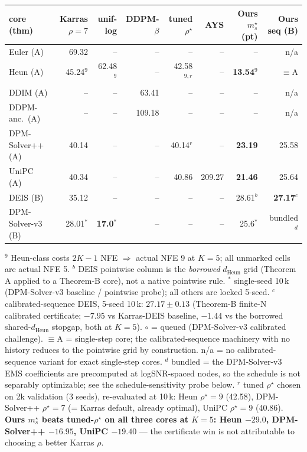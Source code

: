 \documentclass[11pt]{article}
\begin{document}
\begin{center}
\scriptsize
\begin{tabular}{l r r r r r r r}
\toprule
core (thm) & Karras \(\rho{=}7\) & unif-log & DDPM-\(\beta\) & tuned \(\rho^\star\) & AYS & Ours \(m_s^\star\) (pt) & Ours seq (B) \\
\midrule
Euler (A)            & 69.32        & --            & --      & --     & --       & --              & n/a \\
Heun (A)             & 45.24\(^9\)  & 62.48\(^9\)   & --      & 42.58\(^{9,r}\) & --       & \textbf{13.54}\(^9\) & \(\equiv\)A \\
DDIM (A)             & --           & --            & 63.41   & --     & --       & --              & n/a \\
DDPM-anc.\ (A)       & --           & --            & 109.18  & --     & --       & --              & n/a \\
DPM-Solver++ (A)     & 40.14        & --            & --      & 40.14\(^{r}\) & --       & \textbf{23.19}  & 25.58 \\
UniPC (A)            & 40.34        & --            & --      & 40.86  & 209.27   & \textbf{21.46}  & 25.64 \\
DEIS (B)             & 35.12        & --            & --      & --     & --       & 28.61\(^b\)     & \textbf{27.17}\(^c\) \\
DPM-Solver-v3 (B)    & 28.01\(^*\)  & \textbf{17.0}\(^*\) & -- & --     & --       & 25.6\(^*\) & bundled\(^d\) \\
\bottomrule
\end{tabular}
\end{center}

\noindent
\(^9\) Heun-class costs \(2K{-}1\) NFE \(\Rightarrow\) actual NFE 9 at
\(K{=}5\); all unmarked cells are actual NFE 5.
\(^b\) DEIS pointwise column is the \emph{borrowed} \(d_{\mathrm{Heun}}\)
grid (Theorem A applied to a Theorem-B core), not a native pointwise
rule.
\(^*\) single-seed 10\,k (DPM-Solver-v3 baseline / pointwise probe);
all others are locked 5-seed.
\(^c\) calibrated-sequence DEIS, 5-seed 10\,k: \(27.17{\pm}0.13\) (Theorem-B
finite-N calibrated certificate; \(-7.95\) vs Karras-DEIS baseline,
\(-1.44\) vs the borrowed shared-\(d_{\mathrm{Heun}}\) stopgap, both at
\(K{=}5\)).
\(\circ\) = queued (DPM-Solver-v3 calibrated challenge).
\(\equiv\)A = single-step core; the calibrated-sequence machinery with no
history reduces to the pointwise grid by construction.
n/a = no calibrated-sequence variant for exact single-step cores.
\(^d\) bundled = the DPM-Solver-v3 EMS coefficients are precomputed at
logSNR-spaced nodes, so the schedule is not separably optimizable;
see the schedule-sensitivity probe below.
\(^r\) tuned \(\rho^\star\) chosen on 2k validation (3 seeds), re-evaluated
at 10\,k: Heun \(\rho^\star{=}9\) (42.58), DPM-Solver++ \(\rho^\star{=}7\)
(= Karras default, already optimal), UniPC \(\rho^\star{=}9\) (40.86).
\textbf{Ours \(m_s^\star\) beats tuned-\(\rho^\star\) on all three cores
at \(K{=}5\): Heun \(-29.0\), DPM-Solver++ \(-16.95\), UniPC \(-19.40\)}
--- the certificate win is not attributable to choosing a better Karras
\(\rho\).
\end{document}
